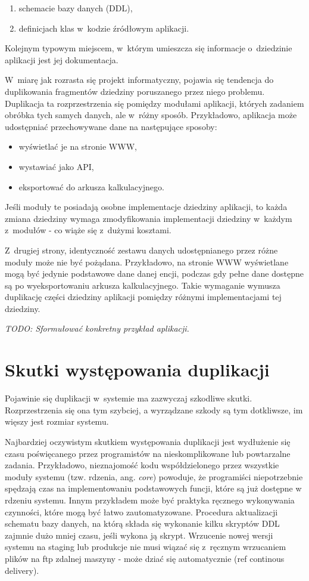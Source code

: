 \begin{enumerate}
 \item schemacie bazy danych (DDL),
 \item definicjach klas w~kodzie źródłowym aplikacji.
\end{enumerate}

Kolejnym typowym miejscem, w~którym umieszcza się informacje o~dziedzinie aplikacji jest jej dokumentacja.

W~miarę jak rozrasta się projekt informatyczny, pojawia się tendencja do duplikowania fragmentów dziedziny poruszanego przez niego problemu.
Duplikacja ta rozprzestrzenia się pomiędzy modułami aplikacji, których zadaniem obróbka tych samych danych, ale w~różny sposób.
Przykładowo, aplikacja może udostępniać przechowywane dane na następujące sposoby:

\begin{itemize}
 \item wyświetlać je na stronie WWW,
 \item wystawiać jako API,
 \item eksportować do arkusza kalkulacyjnego.
\end{itemize}

Jeśli moduły te posiadają osobne implementacje dziedziny aplikacji, to każda zmiana dziedziny wymaga zmodyfikowania implementacji dziedziny w~każdym z~modułów - co wiąże się z~dużymi kosztami.

Z~drugiej strony, identyczność zestawu danych udostępnianego przez różne moduły może nie być pożądana.
Przykładowo, na stronie WWW wyświetlane mogą być jedynie podstawowe dane danej encji, podczas gdy pełne dane dostępne są po wyeksportowaniu arkusza kalkulacyjnego.
Takie wymaganie wymusza duplikację części dziedziny aplikacji pomiędzy różnymi implementacjami tej dziedziny.


\emph{TODO: Sformułować konkretny przykład aplikacji.}



\section{Skutki występowania duplikacji}

Pojawinie się duplikacji w~systemie ma zazwyczaj szkodliwe skutki.
Rozprzestrzenia się ona tym szybciej, a wyrządzane szkody są tym dotkliwsze, im więszy jest rozmiar systemu.

Najbardziej oczywistym skutkiem występowania duplikacji jest wydłużenie się czasu poświęcanego przez programistów na nieskomplikowane lub powtarzalne zadania.
Przykładowo, nieznajomość kodu współdzielonego przez wszystkie moduły systemu (tzw. rdzenia, ang. \emph{core}) powoduje, że programiści niepotrzebnie spędzają czas na implementowaniu podstawowych funcji, które są już dostępne w rdzeniu systemu.
Innym przykładem może być praktyka ręcznego wykonywania czynności, które mogą być łatwo zautomatyzowane.
Procedura aktualizacji schematu bazy danych, na którą składa się wykonanie kilku skryptów DDL zajmnie dużo mniej czasu, jeśli wykona ją skrypt.
Wrzucenie nowej wersji systemu na staging lub produkcje nie musi wiązać się z~ręcznym wrzucaniem plików na ftp zdalnej maszyny - może dziać się automatycznie (ref continous delivery).


